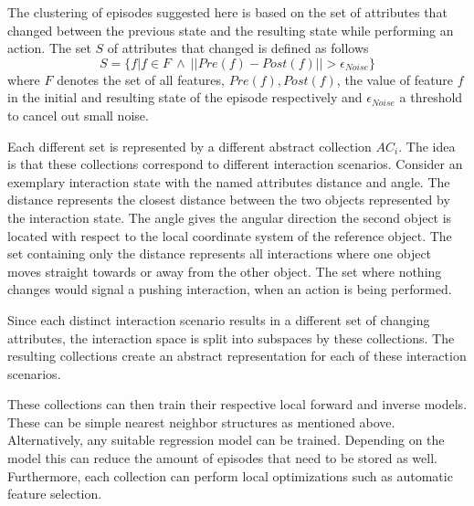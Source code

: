 The clustering of episodes suggested here is based on the set of attributes that changed between the previous state and the resulting state while performing an action. The set $S$ of attributes that changed is defined as follows 
\begin{equation}
S = \{f | f \in F ~ \wedge ~ ||Pre(f)-Post(f)|| > \epsilon_{Noise}\}
\end{equation}
where $F$ denotes the set of all features, $Pre(f), Post(f)$, the value of 
feature $f$ in the initial and resulting state of the episode respectively and 
$\epsilon_{Noise}$ a threshold to cancel out small noise.

Each different set is represented by a different abstract collection $AC_i$. The 
idea is that these collections correspond to different interaction scenarios.
Consider an exemplary interaction state with the named attributes distance and angle.
The distance represents the closest distance between the two objects represented by the interaction state. The angle gives the angular direction the second object is located with respect to the local coordinate system of the reference object. The set containing only the distance represents all interactions where one object moves straight towards or away from the other object. The set where nothing changes would signal a pushing interaction, when an action is being performed.

Since each distinct interaction scenario results in a different set of changing attributes, the interaction space is split into subspaces by these collections. The resulting collections create an abstract representation for each of these interaction scenarios.

These collections can then train their respective local forward and inverse models. These can be simple nearest neighbor structures as mentioned above. Alternatively, any suitable regression model can be trained. Depending on the model this can reduce the amount of episodes that need to be stored as well. Furthermore, each collection can perform local optimizations such as automatic feature selection.

